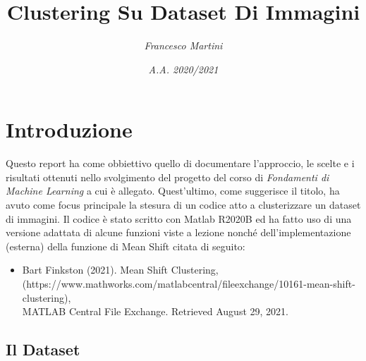 \documentclass[]{report}
\title{\huge \textbf{Clustering Su Dataset Di Immagini}}
\author{\textit{Francesco Martini}}
\date{\textit{A.A. 2020/2021}}
\begin{document}
\maketitle
\chapter*{\huge Introduzione}

	Questo report ha come obbiettivo quello di documentare l'approccio, le scelte e i risultati ottenuti nello svolgimento del progetto del corso di {\it Fondamenti di Machine Learning}  a cui è allegato. Quest'ultimo, come suggerisce il titolo, ha avuto come focus principale la stesura di un codice atto a clusterizzare  un dataset di immagini. Il codice è stato scritto con Matlab R2020B ed ha fatto uso di una versione adattata di alcune funzioni viste a lezione nonché dell'implementazione (esterna) della funzione di Mean Shift citata di seguito:
	\begin{itemize}
		\item Bart Finkston (2021). Mean Shift Clustering,\\
		     (https://www.mathworks.com/matlabcentral/fileexchange/10161-mean-shift-clustering),\\ 
		     MATLAB Central File Exchange. Retrieved August 29, 2021. 
	\end{itemize} 
		
\section*{Il Dataset}	
	
\end{document}
